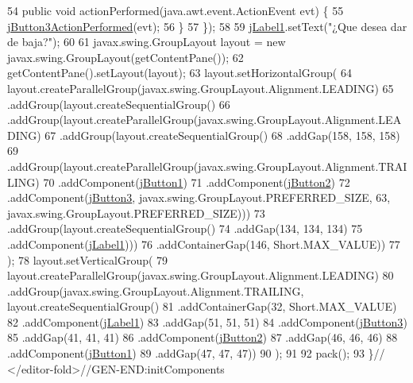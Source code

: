 \begin{DoxyCode}
54             \textcolor{keyword}{public} \textcolor{keywordtype}{void} actionPerformed(java.awt.event.ActionEvent evt) \{
55                 \mbox{\hyperlink{class_interfaz_package_1_1_interfaz_baja_adfecaa97fbf001fd74893adda16c8d9b}{jButton3ActionPerformed}}(evt);
56             \}
57         \});
58 
59         \mbox{\hyperlink{class_interfaz_package_1_1_interfaz_baja_a145dfd99a3540638ebf1c737eae819e0}{jLabel1}}.setText(\textcolor{stringliteral}{"¿Que desea dar de baja?"});
60 
61         javax.swing.GroupLayout layout = \textcolor{keyword}{new} javax.swing.GroupLayout(getContentPane());
62         getContentPane().setLayout(layout);
63         layout.setHorizontalGroup(
64             layout.createParallelGroup(javax.swing.GroupLayout.Alignment.LEADING)
65             .addGroup(layout.createSequentialGroup()
66                 .addGroup(layout.createParallelGroup(javax.swing.GroupLayout.Alignment.LEADING)
67                     .addGroup(layout.createSequentialGroup()
68                         .addGap(158, 158, 158)
69                         .addGroup(layout.createParallelGroup(javax.swing.GroupLayout.Alignment.TRAILING)
70                             .addComponent(\mbox{\hyperlink{class_interfaz_package_1_1_interfaz_baja_a12d3d95e2abdc0965a784087da80b5e0}{jButton1}})
71                             .addComponent(\mbox{\hyperlink{class_interfaz_package_1_1_interfaz_baja_ab8ddc56f0ab1aa53f4e8e0f6724b1c98}{jButton2}})
72                             .addComponent(\mbox{\hyperlink{class_interfaz_package_1_1_interfaz_baja_aacfa87c1b80522aa3156f4e63a3fda84}{jButton3}}, javax.swing.GroupLayout.PREFERRED\_SIZE, 63, 
      javax.swing.GroupLayout.PREFERRED\_SIZE)))
73                     .addGroup(layout.createSequentialGroup()
74                         .addGap(134, 134, 134)
75                         .addComponent(\mbox{\hyperlink{class_interfaz_package_1_1_interfaz_baja_a145dfd99a3540638ebf1c737eae819e0}{jLabel1}})))
76                 .addContainerGap(146, Short.MAX\_VALUE))
77         );
78         layout.setVerticalGroup(
79             layout.createParallelGroup(javax.swing.GroupLayout.Alignment.LEADING)
80             .addGroup(javax.swing.GroupLayout.Alignment.TRAILING, layout.createSequentialGroup()
81                 .addContainerGap(32, Short.MAX\_VALUE)
82                 .addComponent(\mbox{\hyperlink{class_interfaz_package_1_1_interfaz_baja_a145dfd99a3540638ebf1c737eae819e0}{jLabel1}})
83                 .addGap(51, 51, 51)
84                 .addComponent(\mbox{\hyperlink{class_interfaz_package_1_1_interfaz_baja_aacfa87c1b80522aa3156f4e63a3fda84}{jButton3}})
85                 .addGap(41, 41, 41)
86                 .addComponent(\mbox{\hyperlink{class_interfaz_package_1_1_interfaz_baja_ab8ddc56f0ab1aa53f4e8e0f6724b1c98}{jButton2}})
87                 .addGap(46, 46, 46)
88                 .addComponent(\mbox{\hyperlink{class_interfaz_package_1_1_interfaz_baja_a12d3d95e2abdc0965a784087da80b5e0}{jButton1}})
89                 .addGap(47, 47, 47))
90         );
91 
92         pack();
93     \}\textcolor{comment}{// </editor-fold>//GEN-END:initComponents}
\end{DoxyCode}
